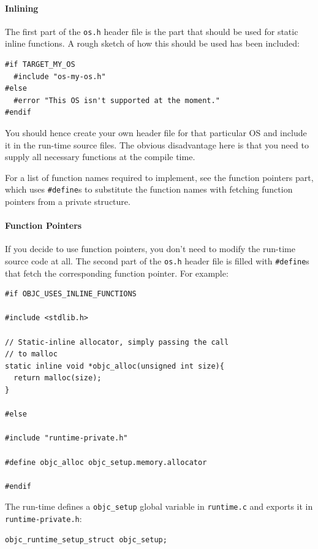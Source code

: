 \paragraph{Inlining}

The first part of the \verb=os.h= header file is the part that should be used for static inline functions. A rough sketch of how this should be used has been included:

\begin{verbatim}
#if TARGET_MY_OS
  #include "os-my-os.h"
#else
  #error "This OS isn't supported at the moment."
#endif
\end{verbatim}

You should hence create your own header file for that particular OS and include it in the run-time source files. The obvious disadvantage here is that you need to supply all necessary functions at the compile time.

For a list of function names required to implement, see the function pointers part, which uses \verb=#define=s to substitute the function names with fetching function pointers from a private structure.

\paragraph{Function Pointers}

If you decide to use function pointers, you don't need to modify the run-time source code at all. The second part of the \verb=os.h= header file is filled with \verb=#define=s that fetch the corresponding function pointer. For example:

\begin{verbatim}
#if OBJC_USES_INLINE_FUNCTIONS

#include <stdlib.h>

// Static-inline allocator, simply passing the call
// to malloc
static inline void *objc_alloc(unsigned int size){
  return malloc(size);
}

#else

#include "runtime-private.h"

#define objc_alloc objc_setup.memory.allocator

#endif

\end{verbatim}

The run-time defines a \verb=objc_setup= global variable in \verb=runtime.c= and exports it in \verb=runtime-private.h=:
 
\begin{verbatim}
objc_runtime_setup_struct objc_setup;
\end{verbatim}

